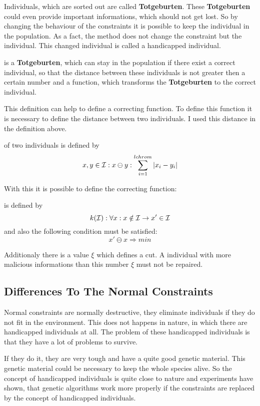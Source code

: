 Individuals, which are sorted out are called {\bf Totgeburten}. These {\bf Totgeburten}
could even provide important informations, which should not get lost. So by
changing the behaviour of the constraints it is possible to keep the individual
in the population. As a fact, the method does not change the constraint but the
individual. This changed individual is called a handicapped individual.

\begin{definition} is a {\bf Totgeburten}, which can
stay in the population if there exist a correct individual, so that the distance
between these individuals is not greater then a certain number and a function,
which transforms the {\bf Totgeburten} to the correct individual.
\end{definition}

This definition can help to define a correcting function. To define this function
it is necessary to define the distance between two individuals. I used this
distance in the definition above.

\begin{definition} of two individuals is defined by
$$x,y \in {\cal I}: x \ominus y : \sum_{i = 1}^{lchrom} | x_i - y_i | $$
\end{definition}
With this it is possible to define the correcting function:
\begin{definition} is defined by
$$k({\cal I}): \forall x: x \notin {\cal I} \to x' \in {\cal I}$$
and also the following condition must be satisfied:
$$x' \ominus x \Longrightarrow min$$
\end{definition}

Additionaly there is a value $\xi$ which defines a cut. A individual with more
malicious informations than this number $\xi$ must not be repaired.
\subsection{Differences To The Normal Constraints}
Normal constraints are normally destructive, they eliminate individuals if they
do not fit in the environment. This does not happens in nature, in which there
are handicapped individuals at all. The problem of these handicapped individuals
is that they have a lot of problems to survive.

If they do it, they are very tough and have a quite good genetic material. This
genetic material could be necessary to keep the whole species alive. So the
concept of handicapped individuals is quite close to nature and experiments
\cite{Joc91} have shown, that genetic algorithms work more properly if the
constraints are replaced by the concept of handicapped individuals.
